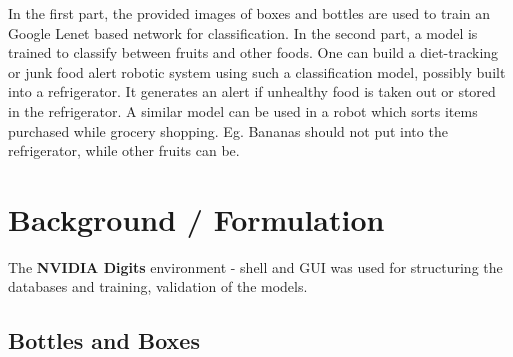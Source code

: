 \documentclass[10pt,journal,compsoc]{IEEEtran}
\begin{document}
In the first part, the provided images of boxes and bottles are used to train an Google Lenet based network for classification. In the second part, a model is trained to classify between fruits and other foods. One can build a diet-tracking or junk food alert robotic system using such a classification model, possibly built into a refrigerator. It generates an alert if unhealthy food is taken out or stored in the refrigerator. A similar model can be used in a robot which sorts items purchased while grocery shopping. Eg. Bananas should not put into the refrigerator, while other fruits can be.
%
%
%

%



   

\section{Background / Formulation}
The \textbf{NVIDIA Digits} environment - shell and GUI was used for structuring the databases and training, validation of the models.
\subsection{Bottles and Boxes}
\end{document}

